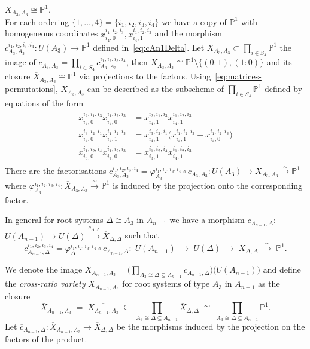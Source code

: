 \documentclass[ALCO,ThmDefs,Unicode,epreuves]{cedram}
\def\phi{\varphi}
\def\P{\mathds P}
\begin{document}
\begin{exam}\label{ex:xA3A3} $\overline{X}_{A_3,A_3}\cong\P^1$.\\
For each ordering $\{1,\ldots,4\}=\{i_1,i_2,i_3,i_4\}$ we have a copy of $\P^1$
with homogeneous coordinates $x^{i_1,i_2,i_3}_{i_4,0},x^{i_1,i_2,i_3}_{i_4,1}$
and the morphism $c_{A_3,A_3}^{i_1,i_2,i_3,i_4}\colon U(A_3)\to\P^1$ defined 
in~\eqref{eq:cAn1Delta}. Let $X_{A_3,A_3}\subset\prod_{i\in S_4}\P^1$ 
the image of $c_{A_3,A_3}=\prod_{i\in S_4}c_{A_3,A_3}^{i_1,i_2,i_3,i_4}$, 
then $X_{A_3,A_3}\cong\P^1\setminus\{(0:1),(1:0)\}$ and its closure 
$\overline{X}_{A_3,A_3}\cong\P^1$ via projections to the factors.
Using~\eqref{eq:matrices-permutations}, $\overline{X}_{A_3,A_3}$
can be described as the subscheme of $\prod_{i\in S_4}\P^1$ defined by 
equations of the form
\begin{equation}\label{eq:M04-x}
\begin{aligned} 
x^{i_2,i_1,i_3}_{i_4,0}x^{i_1,i_2,i_3}_{i_4,0}
&=x^{i_2,i_1,i_3}_{i_4,1}x^{i_1,i_2,i_3}_{i_4,1}\\
x^{i_3,i_2,i_1}_{i_4,0}x^{i_1,i_2,i_3}_{i_4,1}&=
x^{i_3,i_2,i_1}_{i_4,1}\big(x^{i_1,i_2,i_3}_{i_4,1}-x^{i_1,i_2,i_3}_{i_4,0}\big)\\
x^{i_1,i_2,i_4}_{i_3,0}x^{i_1,i_2,i_3}_{i_4,0}
&=x^{i_1,i_2,i_4}_{i_3,1}x^{i_1,i_2,i_3}_{i_4,1}\\
\end{aligned}
\end{equation}
There are the factorisations 
$c_{A_3,A_3}^{i_1,i_2,i_3,i_4}=\phi_{A_3}^{i_1,i_2,i_3,i_4}\circ c_{A_3,A_3}\colon 
U(A_3)\to\overline{X}_{A_3,A_3}\stackrel{\sim}{\to}\P^1$ where 
$\phi_{A_3}^{i_1,i_2,i_3,i_4}\colon\overline{X}_{A_3,A_3}\stackrel{\sim}{\to}\P^1$ 
is induced by the projection onto the corresponding factor.
\end{exam}

In general for root systems $\Delta\cong A_3$ in $A_{n-1}$ we have a morphism 
$c_{A_{n-1},\Delta}\colon$ $U(A_{n-1})\to U(\Delta)
\stackrel{c_{\Delta,\Delta}}{\longrightarrow}\overline{X}_{\Delta,\Delta}$ 
such that
\[
c^{i_1,i_2,i_3,i_4}_{A_{n-1},\Delta}
=\phi_\Delta^{i_1,i_2,i_3,i_4}\circ c_{A_{n-1},\Delta}\colon
\;U(A_{n-1})\;\to\;U(\Delta)\;\to\;\overline{X}_{\Delta,\Delta}\;\stackrel{\sim}{\to}\;\P^1.
\]

\begin{defi}
We denote the image $X_{A_{n-1},A_3}\!=\!\big(\prod_{A_3\cong\Delta\subseteq A_{n-1}}
c_{A_{n-1},\Delta}\big)\big(U(A_{n-1})\big)$ and define the {\it cross-ratio variety} 
$\overline{X}_{A_{n-1},A_3}$ for root systems of type $A_3$ in $A_{n-1}$ as the 
closure
\[\textstyle
\overline{X}_{A_{n-1},A_3}\;=\;\overline{X_{A_{n-1},A_3}}
\;\subseteq\;\prod_{A_3\cong\Delta\subseteq A_{n-1}}\overline{X}_{\Delta,\Delta}
\;\cong\;\prod_{A_3\cong\Delta\subseteq A_{n-1}}\P^1.
\]
Let $\overline{c}_{A_{n-1},\Delta}\colon\overline{X}_{A_{n-1},A_3}\to
\overline{X}_{\Delta,\Delta}$ be the morphisms induced by the projection on the 
factors of the product.
\end{defi}
\end{document}
